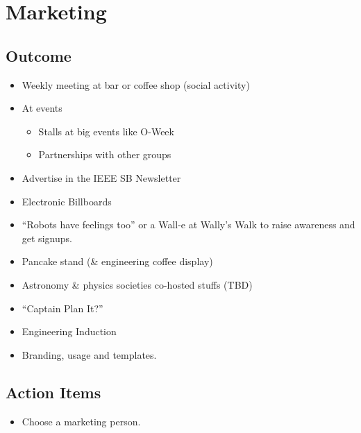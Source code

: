 \section{Marketing}
\label{sec:Marketing}
\subsection{Outcome}
\begin{itemize}
  \item Weekly meeting at bar or coffee shop (social activity)
  \item At events
  \begin{itemize}
    \item Stalls at big events like O-Week
    \item Partnerships with other groups
  \end{itemize}
  \item Advertise in the IEEE SB Newsletter
  \item Electronic Billboards
  \item ``Robots have feelings too'' or a Wall-e at Wally's Walk to raise
  awareness and get signups.
  \item Pancake stand (\& engineering coffee display)
  \item Astronomy \& physics societies co-hosted stuffs (TBD)
  \item ``Captain Plan It?''
  \item Engineering Induction
  \item Branding, usage and templates.
\end{itemize}

\subsection{Action Items}
\begin{itemize}
  \item Choose a marketing person.
\end{itemize}